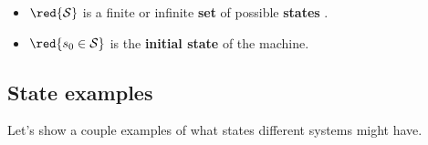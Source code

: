         \begin{itemize}
            \item $\red{\mathcal{S}}$ is a finite or infinite \textbf{set} of possible \textbf{states} .
            \item $\red{s_0 \in \mathcal{S}}$ is the \textbf{initial state} of the machine. 
        \end{itemize}




    \phantom{}

    \subsection{State examples}
        Let's show a couple examples of what states different systems might have.
        
